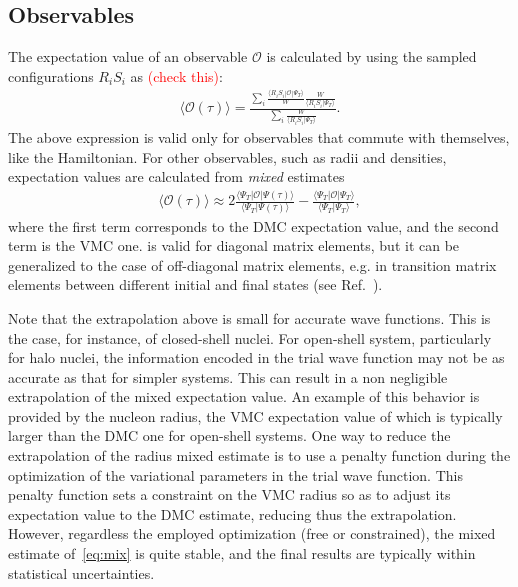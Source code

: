 \documentclass[aps,prc,twocolumn,superscriptaddress,floatfix]{revtex4-1}
\newcommand{\red}[1]{\protect\textcolor{red}{#1}}
\begin{document}
\subsection{Observables}
\label{sec:obs}
The expectation value of an observable $\mathcal O$ is calculated by using the sampled configurations $R_iS_i$ as \red{(check this)}:
\begin{align}
\displaystyle\langle \mathcal O(\tau)\rangle=\frac{\displaystyle\sum_i \frac{\langle R_iS_i|\mathcal O|\Psi_T\rangle}{W}\frac{W}{\langle R_iS_i|\Psi_T\rangle}}
{\displaystyle\sum_i\frac{W}{\langle R_iS_i|\Psi_T\rangle}}.
\label{eq:obs}
\end{align}
The above expression is valid only for observables that commute with themselves, like the Hamiltonian.
For other observables, such as radii and densities, expectation values are calculated from \emph{mixed} estimates 
\begin{align}
\langle\mathcal O(\tau)\rangle\approx2\frac{\langle\Psi_T|\mathcal O|\Psi(\tau)\rangle}{\langle\Psi_T|\Psi(\tau)\rangle}
-\frac{\langle\Psi_T|\mathcal O|\Psi_T\rangle}{\langle\Psi_T|\Psi_T\rangle}	,
\label{eq:mix}
\end{align}
where the first term corresponds to the DMC expectation value, and the second term is the VMC one.
 is valid for diagonal matrix elements, but it can be generalized to the case of off-diagonal matrix 
elements, e.g. in transition matrix elements between different initial and final states
(see Ref.~\cite{Pervin:2007}). 

Note that the extrapolation above is small for accurate wave functions.
This is the case, for instance, of closed-shell nuclei.
For open-shell system, particularly for halo nuclei, the information encoded in the trial
wave function may not be as accurate as that for simpler systems. This can result in
a non negligible extrapolation of the mixed expectation value.
An example of this behavior is provided by the nucleon radius, 
the VMC expectation value of which is typically larger than the DMC one
for open-shell systems. One way to reduce the extrapolation of the radius mixed estimate
is to use a penalty function during the optimization of the variational parameters 
in the trial wave function. This penalty function sets a constraint on the VMC radius so as to
adjust its expectation value to the DMC estimate, reducing thus the extrapolation.
However, regardless the employed optimization (free or constrained), the mixed estimate 
of~\cref{eq:mix} is quite stable, and the final results are typically within statistical uncertainties.
\end{document}
